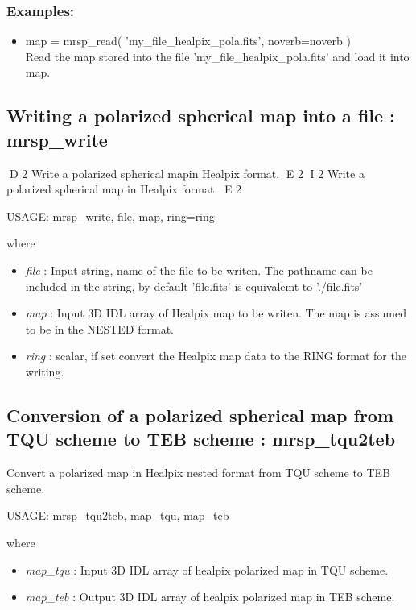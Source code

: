 \subsubsection*{Examples:} 
\begin{itemize}
\item map = mrsp\_read( 'my\_file\_healpix\_pola.fits', noverb=noverb ) \\
Read the map stored into the file 'my\_file\_healpix\_pola.fits' and load it into map.
\end{itemize}



\subsection{Writing a polarized spherical map into a file : mrsp\_write}
D 2
Write a polarized spherical mapin Healpix format.
E 2
I 2
Write a polarized spherical map in Healpix format.
E 2
{\bf
\begin{center}
     USAGE: mrsp\_write, file, map, ring=ring
\end{center}}
where
\begin{itemize}
\item {\em file} : Input string, name of the file to be writen. The pathname can be included in the string, by default 'file.fits' is equivalemt to './file.fits'
\item {\em map} : Input 3D IDL array of Healpix map to be writen. The map is assumed to be in the NESTED format.
\item {\em ring} : scalar, if set convert the Healpix map data to the RING format for the writing.
\end{itemize}



\subsection{Conversion of a polarized spherical map from TQU scheme to TEB scheme : mrsp\_tqu2teb}
Convert a polarized map in Healpix nested format from TQU scheme to TEB scheme.
{\bf
\begin{center}
     USAGE: mrsp\_tqu2teb, map\_tqu, map\_teb
\end{center}}
where
\begin{itemize}
\item {\em map\_tqu} : Input 3D IDL array of healpix polarized map in TQU scheme.
\item {\em map\_teb} : Output 3D IDL array of healpix polarized map in TEB scheme.
\end{itemize}




